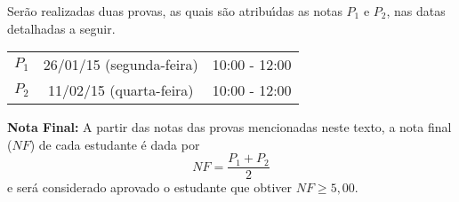 \documentclass[12pt]{article}
\begin{document}
 Ser\~ao realizadas duas provas, as quais s\~{a}o atribu\'{\i}das as notas $P_1$ e $P_2$, nas datas detalhadas a seguir.

\begin{center}
    \begin{tabular}{c|c|c}
        \hline\hline
        \hspace{1cm}{\bf Prova}\hspace{1cm} & \hspace{3cm}{\bf Data}\hspace{3cm} & \hspace{1.7cm}{\bf Hor\'{a}rio}\hspace{1.7cm} \\
        \hline\hline
        $P_1$ & 26/01/15 (segunda-feira) \phantom{x} & 10:00 - 12:00 \\
        \hline
        $P_2$ & 11/02/15 (quarta-feira) \phantom{x} & 10:00 - 12:00 \\
        \hline\hline
    \end{tabular}
\end{center}

{\bf \noindent Nota Final:} A partir das notas das provas mencionadas neste texto, a nota final ($NF$) de cada estudante \'{e} dada
por
\vspace{-0.15cm}
\[
NF = \frac{ P_1 + P_2}{2}
\]
e ser\'{a} considerado aprovado o estudante que obtiver $NF \geq 5,00$.

\end{document}
